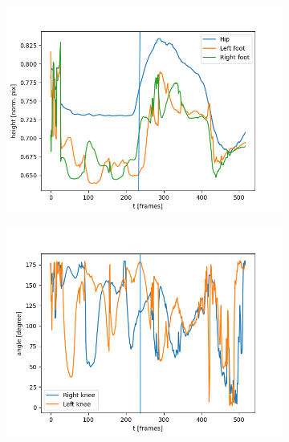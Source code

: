 \begin{figure}[h!]
    \begin{subfigure}[b]{0.5\textwidth}
        \includegraphics*[scale=0.45]{jump_runup_poor_start.png}
        \captionsetup{justification=centering, singlelinecheck=false, labelfont=bf}
        \label{subfig:runup_jump_landing_height}
    \end{subfigure}
    \begin{subfigure}[b]{0.5\textwidth}
        \includegraphics*[scale=0.45]{jump_runup_poor_start_angles.png}
        \label{subfig:runup_jump_landing_angles}
    \end{subfigure}
    \begin{subfigure}[b]{0.5\textwidth}

\end{subfigure}
\end{figure}
